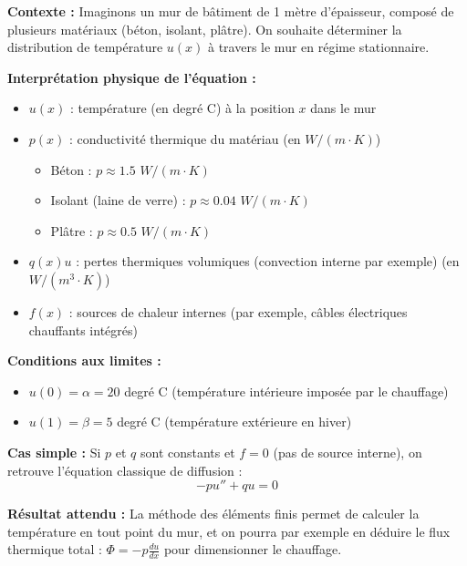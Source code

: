 \documentclass[11pt,a4paper]{report}
\begin{document}
\begin{exempleBox}
\textbf{Contexte :} Imaginons un mur de bâtiment de 1 mètre d'épaisseur, composé de plusieurs matériaux (béton, isolant, plâtre). On souhaite déterminer la distribution de température $u(x)$ à travers le mur en régime stationnaire.

\vspace{0.3cm}

\textbf{Interprétation physique de l'équation :}

\begin{itemize}
    \item \textbf{$u(x)$} : température (en degré C) à la position $x$ dans le mur
    \item \textbf{$p(x)$} : conductivité thermique du matériau (en $W/(m \cdot K)$)
    \begin{itemize}
        \item Béton : $p \approx 1.5$ $W/(m \cdot K)$
        \item Isolant (laine de verre) : $p \approx 0.04$ $W/(m \cdot K)$
        \item Plâtre : $p \approx 0.5$ $W/(m \cdot K)$
    \end{itemize}
    \item \textbf{$q(x) u$} : pertes thermiques volumiques (convection interne par exemple) (en $W/(m^3 \cdot K)$)
    \item \textbf{$f(x)$} : sources de chaleur internes (par exemple, câbles électriques chauffants intégrés)
\end{itemize}

\vspace{0.3cm}


\textbf{Conditions aux limites :}
\begin{itemize}
    \item $u(0) = \alpha = 20$ degré C (température intérieure imposée par le chauffage)
    \item $u(1) = \beta = 5$ degré C (température extérieure en hiver)
\end{itemize}

\vspace{0.3cm}

\textbf{Cas simple :} Si $p$ et $q$ sont constants et $f = 0$ (pas de source interne), on retrouve l'équation classique de diffusion :
\[
-p u'' + q u = 0
\]

\textbf{Résultat attendu :} La méthode des éléments finis permet de calculer la température en tout point du mur, et on pourra par exemple en déduire le flux thermique total : $\Phi = -p \frac{du}{dx}$ pour dimensionner le chauffage.
\end{exempleBox}
\end{document}
